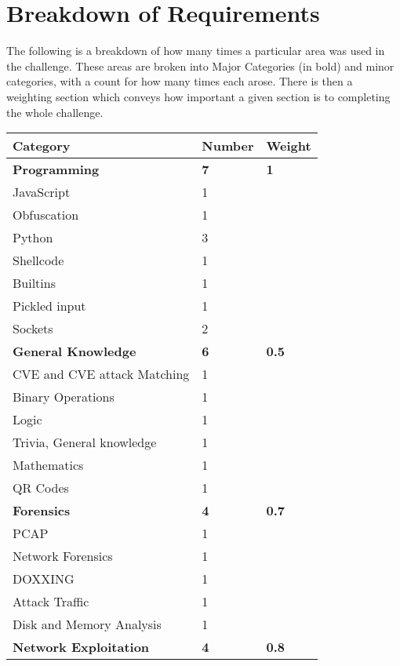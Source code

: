 \documentclass[a4paper,11pt]{report}
\begin{document}
	\section{Breakdown of Requirements}
	 	The following is a breakdown of how many times a particular area was used in the challenge. 
		These areas are broken into Major Categories (in bold) and minor categories, with a count for how many times each arose. 
		There is then a weighting section which conveys how important a given section is to completing the whole challenge. 
		\begin{table}[htb]
			\centering
			\begin{tabular}{| l | l | l |}
				\hline
				\textbf{Category} & \textbf{Number} & \textbf{Weight} \\ \hline 
				\textbf{Programming} & \textbf{7} & \textbf{1} \\ \hline
				\quad JavaScript & 1 & \\ \hline 
				\quad Obfuscation & 1 & \\ \hline
				\quad Python & 3 & \\ \hline 
				\qquad Shellcode & 1 & \\ \hline 
				\qquad Builtins & 1 & \\ \hline 
				\qquad Pickled input & 1 & \\ \hline 
				\quad Sockets & 2 & \\ \hline 
				\textbf{General Knowledge} & \textbf{6} & \textbf{0.5}\\ \hline 
				\quad CVE and CVE attack Matching & 1 & \\ \hline 
				\quad Binary Operations & 1 & \\ \hline 
				\quad Logic & 1 & \\ \hline 
				\quad Trivia, General knowledge & 1 & \\ \hline 
				\quad Mathematics & 1 & \\ \hline 
				\quad QR Codes & 1 & \\ \hline 
				\textbf{Forensics} & \textbf{4} & \textbf{0.7}\\ \hline
				\quad PCAP & 1 & \\ \hline
				\quad Network Forensics & 1 & \\ \hline 
				\quad DOXXING & 1 & \\ \hline 
				\quad Attack Traffic & 1 & \\ \hline 
				\quad Disk and Memory Analysis & 1 & \\ \hline 
				\textbf{Network Exploitation} & \textbf{4} & \textbf{0.8} \\ \hline 

\end{tabular}
\end{table}
\end{document}
